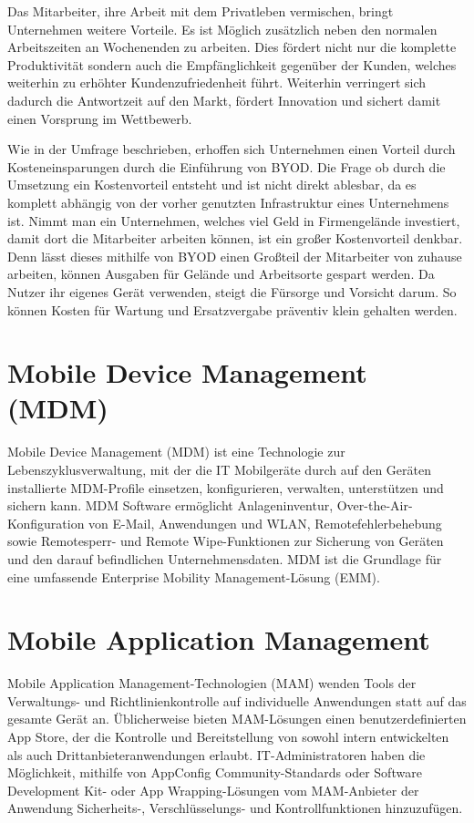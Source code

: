 Das Mitarbeiter, ihre Arbeit mit dem Privatleben vermischen, bringt Unternehmen weitere Vorteile. Es ist Möglich zusätzlich neben den normalen Arbeitszeiten an Wochenenden zu arbeiten. Dies fördert nicht nur die komplette Produktivität sondern auch die Empfänglichkeit gegenüber der Kunden, welches weiterhin zu erhöhter Kundenzufriedenheit führt. Weiterhin verringert sich dadurch die Antwortzeit auf den Markt, fördert Innovation und sichert damit einen Vorsprung im Wettbewerb.

Wie in der Umfrage beschrieben, erhoffen sich Unternehmen einen Vorteil durch Kosteneinsparungen durch die Einführung von BYOD. Die Frage ob durch die Umsetzung ein Kostenvorteil entsteht und ist nicht direkt ablesbar, da es komplett abhängig von der vorher genutzten Infrastruktur eines Unternehmens ist. Nimmt man ein Unternehmen, welches viel Geld in Firmengelände investiert, damit dort die Mitarbeiter arbeiten können, ist ein großer Kostenvorteil denkbar. Denn lässt dieses mithilfe von BYOD einen Großteil der Mitarbeiter von zuhause arbeiten, können Ausgaben für Gelände und Arbeitsorte gespart werden. 
Da Nutzer ihr eigenes Gerät verwenden, steigt die Fürsorge und Vorsicht darum. So können Kosten für Wartung und Ersatzvergabe präventiv klein gehalten werden.










\section{Mobile Device Management (MDM)}
Mobile Device Management (MDM) ist eine Technologie zur Lebenszyklusverwaltung, mit der die IT Mobilgeräte durch auf den Geräten installierte MDM-Profile einsetzen, konfigurieren, verwalten, unterstützen und sichern kann. MDM Software ermöglicht Anlageninventur, Over-the-Air-Konfiguration von E-Mail, Anwendungen und WLAN, Remotefehlerbehebung sowie Remotesperr- und Remote Wipe-Funktionen zur Sicherung von Geräten und den darauf befindlichen Unternehmensdaten. MDM ist die Grundlage für eine umfassende Enterprise Mobility Management-Lösung (EMM). 

\section{Mobile Application Management}
Mobile Application Management-Technologien (MAM) wenden Tools der Verwaltungs- und Richtlinienkontrolle auf individuelle Anwendungen statt auf das gesamte Gerät an. Üblicherweise bieten MAM-Lösungen einen benutzerdefinierten App Store, der die Kontrolle und Bereitstellung von sowohl intern entwickelten als auch Drittanbieteranwendungen erlaubt. IT-Administratoren haben die Möglichkeit, mithilfe von AppConfig Community-Standards oder Software Development Kit- oder App Wrapping-Lösungen vom MAM-Anbieter der Anwendung Sicherheits-, Verschlüsselungs- und Kontrollfunktionen hinzuzufügen. 

